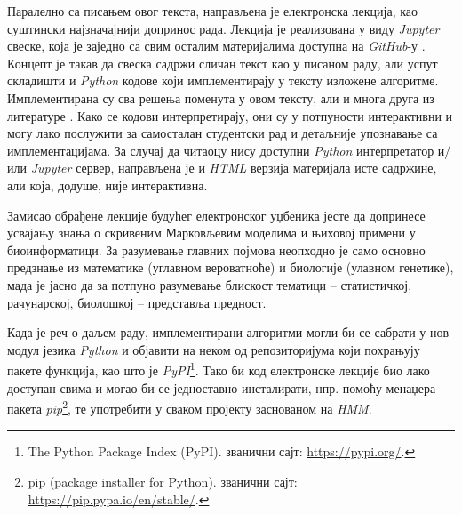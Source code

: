 \documentclass[12pt,oneside]{memoir}
\begin{document}
\begin{CJK}{UTF8}{ipxm}
Паралелно са писањем овог текста, направљена је електронска лекција, као суштински најзначајнији допринос рада. Лекција је реализована у виду \textit{Jupyter} свеске, која је заједно са свим осталим материјалима доступна на \textit{GitHub}-у \cite{vasovich2021}. Концепт је такав да свеска садржи сличан текст као у писаном раду, али успут складишти и \textit{Python} кодове који имплементирају у тексту изложене алгоритме. Имплементирана су сва решења поменута у овом тексту, али и многа друга из литературе \cite{compeau2015}. Како се кодови интерпретирају, они су у потпуности интерактивни и могу лако послужити за самосталан студентски рад и детаљније упознавање са имплементацијама. За случај да читаоцу нису доступни \textit{Python} интерпретатор и/или \textit{Jupyter} сервер, направљена је и \textit{HTML} верзија материјала исте садржине, али која, додуше, није интерактивна.

Замисао обрађене лекције будућег електронског уџбеника јесте да допринесе усвајању знања о скривеним Марковљевим моделима и њиховој примени у биоинформатици. За разумевање главних појмова неопходно је само основно предзнање из математике (углавном вероватноће) и биологије (улавном генетике), мада је јасно да за потпуно разумевање блискост тематици -- статистичкој, рачунарској, биолошкој -- представља предност.

Када је реч о даљем раду, имплементирани алгоритми могли би се сабрати у нов модул језика \textit{Python} и објавити на неком од репозиторијума који похрањују пакете функција, као што је \textit{PyPI}\footnote{The Python Package Index (PyPI). званични сајт: \url{https://pypi.org/}.}. Тако би код електронске лекције био лако доступан свима и могао би се једноставно инсталирати, нпр. помоћу менаџера пакета \textit{pip}\footnote{pip (package installer for Python). званични сајт: \url{https://pip.pypa.io/en/stable/}.}, те употребити у сваком пројекту заснованом на \textit{HMM}.

\literatura

\end{CJK}
\end{document}
